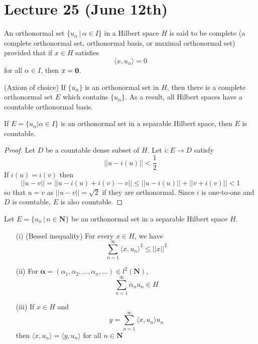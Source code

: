 \section{Lecture 25 (June 12th)}
\begin{defi}
An orthonormal set $\{u_{\alpha } \,|\, \alpha \in I\}$ in a Hilbert space $H$ is said to be complete (a complete orthonormal set, orthonormal basis, or maximal orthonormal set) provided that if $x\in H$ satisfies 
\[\langle x,u_{\alpha }\rangle =0\]
for all $\alpha \in I$, then $x={\bf 0}$. 
\end{defi}
\vspace{2ex}
\begin{thm}
(Axiom of choice) If $\{u_{\alpha }\}$ is an orthonormal set in $H$, then there is a complete orthonormal set $E$ which contains $\{u_{\alpha }\}$. As a result, all Hilbert spaces have a countable orthonormal basis. 
\end{thm}
\vspace{2ex}
\begin{thm}
If $E=\{u_{\alpha }|\alpha \in I\}$ is an orthonormal set in a separable Hilbert space, then $E$ is countable.
\end{thm}
\vspace{2ex}
\begin{proof}
Let $D$ be a countable dense subset of $H$. Let $i:E\rightarrow D$ satisfy 
\[||u-i(u)||<\dfrac{1}{2}\]
If $i(u)=i(v)$ then 
\[||u-v||=||u-i(u)+i(v)-v||\leq ||u-i(u)||+||v+i(v)||<1\]
so that $u=v$ as $||u-v||=\sqrt{2}$ if they are orthonormal. Since $i$ is one-to-one and $D$ is countable, $E$ is also countable. 
\end{proof}
\vspace{2ex}
\begin{thm}
Let $E=\{u_{n} \,|\, n\in {\bm N}\}$  be an orthonormal set in a separable Hilbert space $H$. 
\begin{itemize}
\item[(i)] (Bessel inequality) For every $x\in H$, we have 
\[\sum ^{\infty }_{n=1}\langle x,u_{n}\rangle ^2\leq ||x||^2\]
\item[(ii)] For ${\bm \alpha } =(\alpha_1,\alpha_2,\ldots ,\alpha _{n},\ldots )\in l^{2}({\bm N})$, 
\[\sum ^{\infty }_{n=1}\alpha _{n}u_{n}\in H\]
\item[(iii)] If $x\in H$ and 
\[y=\sum ^{\infty }_{n=1}\langle x,u_{n}\rangle u_{n}\]
then $\langle x,u_{n}\rangle =\langle y,u_{n}\rangle $ for all $n\in {\bm N}$
\end{itemize}
\end{thm}
